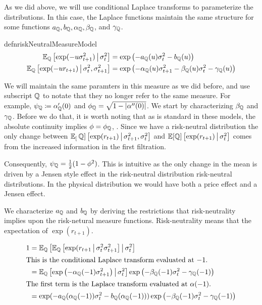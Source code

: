 \documentclass[11pt, letterpaper, twoside, final]{article}
\begin{document}
As we did above, we will use conditional Laplace transforms to parameterize the distributions.
In this case, the Laplace functions maintain the same structure for some functions $a_{\QQ}, b_{\QQ},
\alpha_{\QQ}, \beta_{\QQ}$, and $\gamma_{\QQ}$.

\begin{restatable}{defn}{riskNeutralMeasureModel}
    \label{defn:risk_neutral_model}
    \begin{align}
        \E_{\QQ} \left[\exp(-u \sigma^2_{t+1}) \mvert \sigma^2_t \right] &= \exp\left( - a_{\QQ}(u) \sigma^2_t -
        b_{\QQ}(u) \right) \\
        \E_{\QQ}\left[\exp(-u r_{t+1}) \mvert \sigma^2_t,  \sigma^2_{t+1}\right] &= \exp\left(- \alpha_{\QQ}(u)
        \sigma^2_{t+1} - \beta_{\QQ}(u)\sigma^2_t - \gamma_{\QQ}(u) \right) 
    \end{align}
\end{restatable}

We will maintain the same paramters in this measure as we did before, and use subscript $\QQ$ to notate that they
no longer refer to the same measure.
For example, $\psi_{\QQ} \coloneqq \alpha_{\QQ}'(0)$ and $\phi_{\QQ} = \sqrt{1 - \abs*{\alpha''(0)}}$.
We start by characterizing $\beta_{\QQ}$ and $\gamma_{\QQ}$.
Before we do that, it is worth noting that as is standard in these models, the absolute continuity implies $\phi =
\phi_{\QQ}$, \parencite[17]{khrapov2016affine}.
Since we have a risk-neutral distribution the only change between $\E_[\QQ]\left[\exp(r_{t+1}) \mvert
\sigma^2_{t+1}, \sigma^2_t\right]$ and $\E[\QQ]\left[\exp(r_{t+1}) \mvert \sigma^2_t\right]$ comes from the
increased information in the first filtration.

Consequently, $\psi_{\QQ} = \frac{1}{2} (1 - \phi^2)$.
This is intuitive as the only change in the mean is driven  by  a Jensen style effect in the risk-neutral
distribution risk-neutral distributions.
In the physical distribution we would have both a price effect and a Jensen effect.

We characterize $a_{\QQ}$ and $b_{\QQ}$ by deriving the restrictions that risk-neutrality implies upon the
risk-netural measure functions.
Risk-neutrality means that the expectation of $\exp(r_{t+1})$.

\begin{align}
    1 &= \E_{\QQ}\left[\E_{\QQ}\left[\exp(r_{t+1} \mvert \sigma_t^2 \sigma^2_{t+1}\right]  \mvert \sigma^2_t
        \right] \\
      \intertext{This is the conditional Laplace transform evaluated at $-1$.}
      &= \E_{\QQ}\left[ \exp\left(-\alpha_{\QQ}(-1) \sigma^2_{t+1}\right)  \mvert \sigma^2_t \right] 
         \exp\left(-\beta_{\QQ}(-1) \sigma^2_t - \gamma_{\QQ}(-1)\right)   \\
      \intertext{The first term is the Laplace transform evaluated at $\alpha(-1)$.}
      &= \exp(-a_{\QQ}(\alpha_{\QQ}(-1)) \sigma^2_t - b_{\QQ}(\alpha_{\QQ}(-1))) \exp\left(-\beta_{\QQ}(-1)
         \sigma^2_t - \gamma_{\QQ}(-1)\right)  
\end{align}
\end{document}

